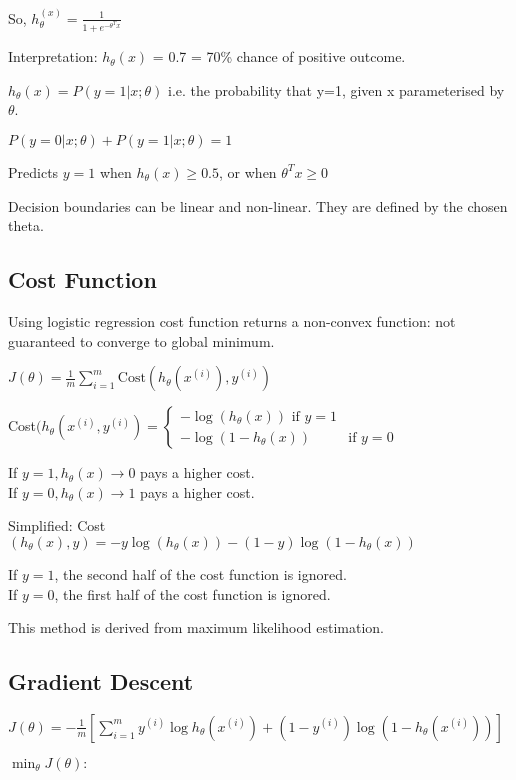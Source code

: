 \documentclass[12pt, a4paper]{article}
\begin{document}
  So, $h_\theta^{(x)} = \frac{1}{1+e^{-\theta^Tx}}$

  Interpretation: $h_\theta(x)$ = 0.7 = 70\% chance of positive outcome.

  $h_\theta(x) = P(y=1|x;\theta)$ i.e. the probability that y=1, given x
  parameterised by $\theta$.

  $P(y=0|x;\theta) + P(y=1|x;\theta) = 1$

  Predicts $y=1$ when $h_\theta(x) \geq 0.5$, or when $\theta^Tx \geq 0$

  Decision boundaries can be linear and non-linear. They are defined
  by the chosen theta.

  \subsection{Cost Function}

  Using logistic regression cost function returns a non-convex function: not
  guaranteed to converge to global minimum.

  $J(\theta) = \frac{1}{m} \displaystyle\sum_{i=1}^{m} \text{Cost}
  (h_\theta(x^{(i)}),y^{(i)})$
  
  Cost$(h_\theta(x^{(i)}, y^{(i)}) = \begin{cases}
    -\log(h_\theta(x)) \text{ if } y=1\\
    -\log(1-h_\theta(x)) & \text{if } y=0 \end{cases}$

  If $y=1, h_\theta(x)\rightarrow0$ pays a higher cost.\\ 
  If $y=0, h_\theta(x)\rightarrow1$ pays a higher cost.

  Simplified: Cost$(h_\theta(x),y) = -y\log(h_\theta(x)) 
  - (1-y)\log(1-h_\theta(x))$

  If $y=1$, the second half of the cost function is ignored.\\
  If $y=0$, the first half of the cost function is ignored.
  
  This method is derived from maximum likelihood estimation.

  \subsection{Gradient Descent}

    $J(\theta) = -\frac{1}{m}[\displaystyle\sum_{i=1}^m 
    y^{(i)}\log h_\theta(x^{(i)}) + (1-y^{(i)})\log(1-h_\theta(x^{(i)}))]$

    $\min_\theta J(\theta):$
\end{document}
